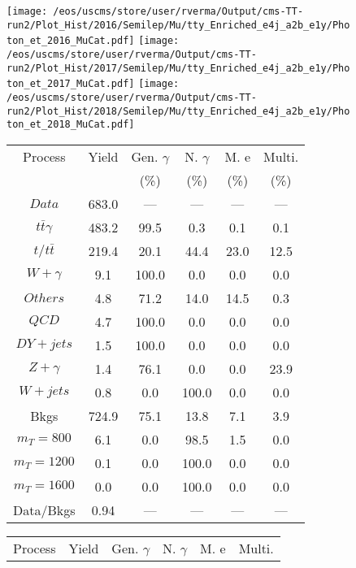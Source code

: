 \begin{figure}
\centering
\texttt{[image: /eos/uscms/store/user/rverma/Output/cms-TT-run2/Plot\_Hist/2016/Semilep/Mu/tty\_Enriched\_e4j\_a2b\_e1y/Photon\_et\_2016\_MuCat.pdf]}
\texttt{[image: /eos/uscms/store/user/rverma/Output/cms-TT-run2/Plot\_Hist/2017/Semilep/Mu/tty\_Enriched\_e4j\_a2b\_e1y/Photon\_et\_2017\_MuCat.pdf]}
\texttt{[image: /eos/uscms/store/user/rverma/Output/cms-TT-run2/Plot\_Hist/2018/Semilep/Mu/tty\_Enriched\_e4j\_a2b\_e1y/Photon\_et\_2018\_MuCat.pdf]}
\begin{minipage}[c]{0.32\textwidth}
\centering
\tiny{
\begin{tabular}{cccccc}
\hline
Process & Yield & Gen. $\gamma$ & N. $\gamma$ & M. e & Multi. \\
 &  & (\%) & (\%) & (\%) & (\%)  \\
\hline
                                                                      $ Data $ &  683.0 &  --- &  --- &  --- &  ---\\
$ t\bar{t}\gamma $ &  483.2 &  99.5 &  0.3 &  0.1 &  0.1\\
$ t/t\bar{t} $ &  219.4 &  20.1 &  44.4 &  23.0 &  12.5\\
$ W+\gamma $ &  9.1 &  100.0 &  0.0 &  0.0 &  0.0\\
$ Others $ &  4.8 &  71.2 &  14.0 &  14.5 &  0.3\\
$ QCD $ &  4.7 &  100.0 &  0.0 &  0.0 &  0.0\\
$ DY+jets $ &  1.5 &  100.0 &  0.0 &  0.0 &  0.0\\
$ Z+\gamma $ &  1.4 &  76.1 &  0.0 &  0.0 &  23.9\\
$ W+jets $ &  0.8 &  0.0 &  100.0 &  0.0 &  0.0\\
Bkgs &  724.9 &  75.1 &  13.8 &  7.1 &  3.9\\
$ m_{T} = 800 $ &  6.1 &  0.0 &  98.5 &  1.5 &  0.0\\
$ m_{T} = 1200 $ &  0.1 &  0.0 &  100.0 &  0.0 &  0.0\\
$ m_{T} = 1600 $ &  0.0 &  0.0 &  100.0 &  0.0 &  0.0\\
Data/Bkgs &  0.94 &  --- &  --- &  --- &  ---\\
\hline
\end{tabular}
}
\end{minipage}
\begin{minipage}[c]{0.32\textwidth}
\centering
\tiny{
\begin{tabular}{cccccc}
\hline
Process & Yield & Gen. $\gamma$ & N. $\gamma$ & M. e & Multi. \\

\end{tabular}}
\end{minipage}
\end{figure}
